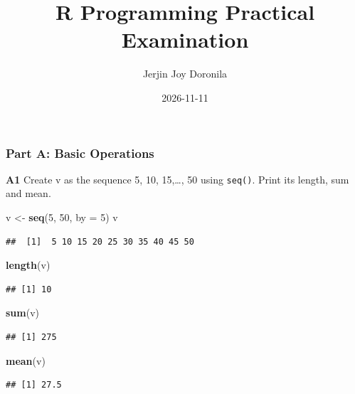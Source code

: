 \documentclass[
]{article}
\title{R Programming Practical Examination}
\author{Jerjin Joy Doronila}
\date{2026-11-11}
\newenvironment{Shaded}{\begin{snugshade}}{\end{snugshade}}
\newcommand{\AttributeTok}[1]{\textcolor[rgb]{0.13,0.29,0.53}{#1}}
\newcommand{\DecValTok}[1]{\textcolor[rgb]{0.00,0.00,0.81}{#1}}
\newcommand{\FunctionTok}[1]{\textcolor[rgb]{0.13,0.29,0.53}{\textbf{#1}}}
\newcommand{\NormalTok}[1]{#1}
\newcommand{\OtherTok}[1]{\textcolor[rgb]{0.56,0.35,0.01}{#1}}
\begin{document}
\maketitle

\subsubsection{Part A: Basic Operations}\label{part-a-basic-operations}

\textbf{A1} Create v as the sequence 5, 10, 15,\ldots, 50 using
\texttt{seq()}. Print its length, sum and mean.

\begin{Shaded}
\begin{Highlighting}[]
\NormalTok{v }\OtherTok{\textless{}{-}} \FunctionTok{seq}\NormalTok{(}\DecValTok{5}\NormalTok{, }\DecValTok{50}\NormalTok{, }\AttributeTok{by =} \DecValTok{5}\NormalTok{)}
\NormalTok{v}
\end{Highlighting}
\end{Shaded}

\begin{verbatim}
##  [1]  5 10 15 20 25 30 35 40 45 50
\end{verbatim}

\begin{Shaded}
\begin{Highlighting}[]
\FunctionTok{length}\NormalTok{(v)}
\end{Highlighting}
\end{Shaded}

\begin{verbatim}
## [1] 10
\end{verbatim}

\begin{Shaded}
\begin{Highlighting}[]
\FunctionTok{sum}\NormalTok{(v)}
\end{Highlighting}
\end{Shaded}

\begin{verbatim}
## [1] 275
\end{verbatim}

\begin{Shaded}
\begin{Highlighting}[]
\FunctionTok{mean}\NormalTok{(v)}
\end{Highlighting}
\end{Shaded}

\begin{verbatim}
## [1] 27.5
\end{verbatim}
\end{document}
